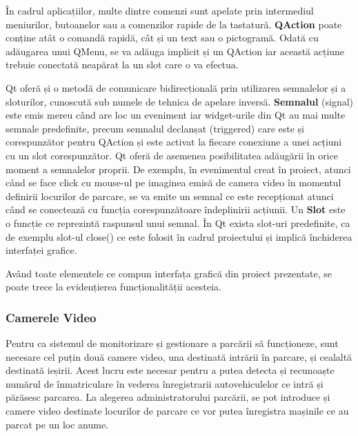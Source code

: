 \documentclass[12pt]{article}
\begin{document}
\^{I}n cadrul aplicațiilor, multe dintre comenzi sunt apelate prin intermediul meniurilor, butoanelor sau a comenzilor rapide de la tastatur\u{a}. \textbf{QAction} poate conține at\^{a}t o comand\u{a} rapid\u{a}, c\^{a}t și un text sau o pictogram\u{a}. Odat\u{a} cu ad\u{a}ugarea unui QMenu, se va ad\u{a}uga implicit și un QAction iar aceast\u{a} acțiune trebuie conectat\u{a} neap\u{a}rat la un slot care o va efectua.

Qt ofer\u{a} și o metod\u{a} de comunicare bidirecțional\u{a} prin utilizarea semnalelor și a sloturilor, cunoscut\u{a} sub numele de tehnica de apelare invers\u{a}. \textbf{Semnalul} (signal) este emis mereu c\^{a}nd are loc un eveniment iar widget-urile din Qt au mai multe semnale predefinite, precum semnalul declanșat (triggered) care este și corespunz\u{a}tor pentru QAction și este activat la fiecare conexiune a unei acțiuni cu un slot corespunz\u{a}tor. Qt ofer\u{a} de asemenea posibilitatea ad\u{a}ug\u{a}rii \^{i}n orice moment a semnalelor proprii. De exemplu, \^{i}n evenimentul creat \^{i}n proiect, atunci c\^{a}nd se face click cu mouse-ul pe imaginea emis\u{a} de camera video \^{i}n momentul definirii locurilor de parcare, se va emite un semnal ce este recepționat atunci c\^{a}nd se conecteaz\u{a} cu funcția corespunz\u{a}toare \^{i}ndeplinirii acțiunii. Un \textbf{Slot} este o funcție ce reprezint\u{a} raspunsul unui semnal. \^{I}n Qt exista slot-uri predefinite, ca de exemplu slot-ul close() ce este folosit \^{i}n cadrul proiectului și implic\u{a} \^{i}nchiderea interfaței grafice.

Av\^{a}nd toate elementele ce compun interfața grafic\u{a} din proiect prezentate, se poate trece la evidențierea funcționalit\u{a}ții acesteia.

\subsubsection{Camerele Video}

Pentru ca sistemul de monitorizare și gestionare a parc\u{a}rii s\u{a} funcționeze, sunt necesare cel puțin dou\u{a} camere video, una destinat\u{a} intr\u{a}rii \^{i}n parcare, și cealalt\u{a} destinat\u{a} ieșirii. Acest lucru este necesar pentru a putea detecta și recunoaște num\u{a}rul de \^{i}nmatriculare  \^{i}n vederea \^{i}nregistrarii autovehiculelor ce intr\u{a} și p\u{a}r\u{a}sesc parcarea. La alegerea administratorului parc\u{a}rii, se pot introduce și camere video destinate locurilor de parcare ce vor putea \^{i}nregistra mașinile ce au parcat pe un loc anume.
\end{document}
